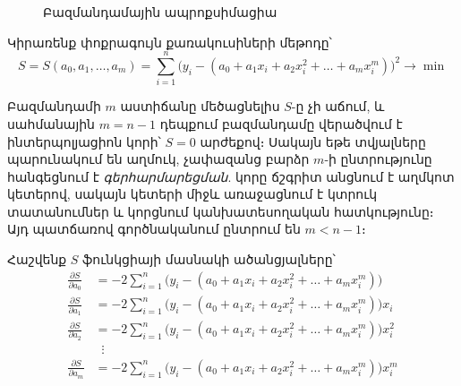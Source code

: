 \documentclass[12pt,a4paper]{article}
\numberwithin{equation}{section}
\numberwithin{figure}{section}
\begin{document}
\begin{figure}[htbp]
    \centering
    \caption{Բազմանդամային ապրոքսիմացիա}
\end{figure}

Կիրառենք փոքրագույն քառակուսիների մեթոդը՝
\[
S = S(a_0, a_1, \dots, a_m) = \sum_{i=1}^n \bigl(y_i - (a_0 + a_1 x_i + a_2 x_i^2 + \dots + a_m x_i^m)\bigr)^2 \to \min
\]

Բազմանդամի $m$ աստիճանը մեծացնելիս $S$-ը չի աճում, և սահմանային $m = n - 1$ դեպքում բազմանդամը վերածվում է ինտերպոլյացիոն կորի՝ $S = 0$ արժեքով։ Սակայն եթե տվյալները պարունակում են աղմուկ, չափազանց բարձր $m$-ի ընտրությունը հանգեցնում է \textit{գերհարմարեցման}. կորը ճշգրիտ անցնում է աղմկոտ կետերով, սակայն կետերի միջև առաջացնում է կտրուկ տատանումներ և կորցնում կանխատեսողական հատկությունը։ Այդ պատճառով գործնականում ընտրում են $m < n - 1$։

Հաշվենք $S$ ֆունկցիայի մասնակի ածանցյալները՝
\begin{align*}
\frac{\partial S}{\partial a_0} &= -2 \sum_{i=1}^n \bigl(y_i - (a_0 + a_1 x_i + a_2 x_i^2 + \dots + a_m x_i^m)\bigr) \\
\frac{\partial S}{\partial a_1} &= -2 \sum_{i=1}^n \bigl(y_i - (a_0 + a_1 x_i + a_2 x_i^2 + \dots + a_m x_i^m)\bigr) x_i \\
\frac{\partial S}{\partial a_2} &= -2 \sum_{i=1}^n \bigl(y_i - (a_0 + a_1 x_i + a_2 x_i^2 + \dots + a_m x_i^m)\bigr) x_i^2 \\
&\;\;\vdots \\
\frac{\partial S}{\partial a_m} &= -2 \sum_{i=1}^n \bigl(y_i - (a_0 + a_1 x_i + a_2 x_i^2 + \dots + a_m x_i^m)\bigr) x_i^m
\end{align*}
\end{document}
